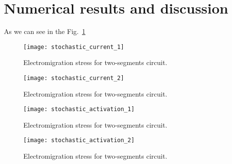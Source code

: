 \section{Numerical results and discussion}
  \label{sec:results}
As we can see in the Fig.~\ref{fig:stochastic_current_1}
\begin{figure}[h]
  \centering
  \texttt{[image: stochastic\_current\_1]}
  \caption{Electromigration stress for two-segments circuit.}
\label{fig:stochastic_current_1}
\end{figure}

\begin{figure}[h]
  \centering
  \texttt{[image: stochastic\_current\_2]}
  \caption{Electromigration stress for two-segments circuit.}
\label{fig:stochastic_current_2}
\end{figure}

\begin{figure}[h]
  \centering
  \texttt{[image: stochastic\_activation\_1]}
  \caption{Electromigration stress for two-segments circuit.}
\label{fig:stochastic_activation_1}
\end{figure}

\begin{figure}[h]
  \centering
  \texttt{[image: stochastic\_activation\_2]}
  \caption{Electromigration stress for two-segments circuit.}
\label{fig:stochastic_activation_2}
\end{figure}
